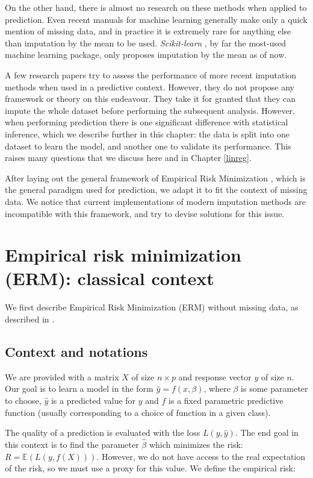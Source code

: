 \documentclass[12pt, a4paper]{memoir}
\begin{document}
On the other hand, there is almost no research on these methods when applied to prediction. Even recent manuals for machine learning \cite{ML_missdata} generally make only a quick mention of missing data, and in practice it is extremely rare for anything else than imputation by the mean to be used. \emph{Scikit-learn} \cite{scikit-learn}, by far the most-used machine learning package, only proposes imputation by the mean as of now. 

A few research papers \cite{prediction_imputation1} \cite{prediction_imputation2} try to assess the performance of more recent imputation methods when used in a predictive context. However, they do not propose any framework or theory on this endeavour. They take it for granted that they can impute the whole dataset before performing the subsequent analysis. However, when performing prediction there is one significant difference with statistical inference, which we describe further in this chapter: the data is split into one dataset to learn the model, and another one to validate its performance. This raises many questions that we discuss here and in Chapter \ref{linreg}. 

After laying out the general framework of Empirical Risk Minimization \cite{ERM}, which is the general paradigm used for prediction, we adapt it to fit the context of missing data. We notice that current implementations of modern imputation methods are incompatible with this framework, and try to devise solutions for this issue.
	\section{Empirical risk minimization (ERM): classical context}
We first describe Empirical Risk Minimization (ERM) without missing data, as described in \cite{ERM}.
		\subsection{Context and notations}
We are provided with a matrix $X$ of size $n \times p$ and response vector $y$ of size $n$. Our goal is to learn a model in the form $\hat{y} = f(x, \beta)$, where $\beta$ is some parameter to choose, $\hat{y}$ is a predicted value for $y$ and $f$ is a fixed parametric predictive function (usually corresponding to a choice of function in a given class).

The quality of a prediction is evaluated with the loss $L(y,\hat{y})$. The end goal in this context is to find the parameter $\hat{\beta}$ which minimizes the risk: $R = \mathbb{E}(L(y, f(X)))$. However, we do not have access to the real expectation of the risk, so we must use a proxy for this value. We define the empirical risk:
\end{document}
